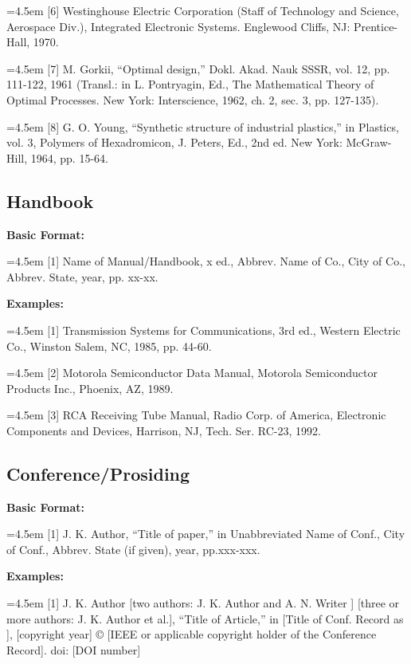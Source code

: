 \hangindent=4.5em 
[6] Westinghouse Electric Corporation (Staff of Technology and Science, Aerospace Div.), Integrated Electronic Systems. Englewood Cliffs, NJ: Prentice-Hall, 1970.

\hangindent=4.5em 
[7] M. Gorkii, “Optimal design,” Dokl. Akad. Nauk SSSR, vol. 12, pp. 111-122, 1961 
(Transl.: in L. Pontryagin, Ed., The Mathematical Theory of Optimal Processes. New 
York: Interscience, 1962, ch. 2, sec. 3, pp. 127-135).

\hangindent=4.5em 
[8] G. O. Young, “Synthetic structure of industrial plastics,” in Plastics, vol. 3, Polymers of Hexadromicon, J. Peters, Ed., 2nd ed. New York: McGraw-Hill, 1964, pp. 15-64.

\newpage
\subsection{Handbook}

\textbf{Basic Format:}

\hangindent=4.5em
[1] Name of Manual/Handbook, x ed., Abbrev. Name of Co., City of Co., Abbrev. State, year, pp. xx-xx.

\textbf{Examples:}

\hangindent=4.5em
[1] Transmission Systems for Communications, 3rd ed., Western Electric Co., 
Winston Salem, NC, 1985, pp. 44-60.

\hangindent=4.5em
[2] Motorola Semiconductor Data Manual, Motorola Semiconductor Products Inc., 
Phoenix, AZ, 1989.

\hangindent=4.5em
[3] RCA Receiving Tube Manual, Radio Corp. of America, Electronic Components and 
Devices, Harrison, NJ, Tech. Ser. RC-23, 1992.

\subsection*{Conference/Prosiding}

\textbf{Basic Format:}

\hangindent=4.5em
[1] J. K. Author, “Title of paper,” in Unabbreviated Name of Conf., City of Conf., Abbrev. State (if given), year, pp.xxx-xxx.

\textbf{Examples:}

\hangindent=4.5em
[1] J. K. Author [two authors: J. K. Author and A. N. Writer ] [three or more authors: J. K. Author et al.], “Title of Article,” in [Title of Conf. Record as ], [copyright year] © [IEEE or applicable copyright holder of the Conference Record]. doi: [DOI number]

